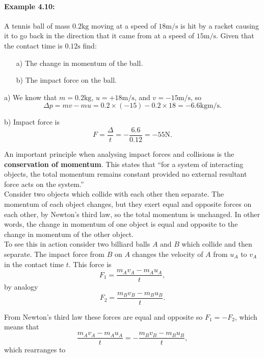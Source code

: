 \documentclass[a4paper,12pt]{book}
\begin{document}
\paragraph{Example 4.10:} A tennis ball of mass $0.2\text{kg}$ moving at a speed of $18\text{m/s}$ is hit by a racket causing it to go back in the direction that it came from at a speed of $15\text{m/s}$. Given that the contact time is $0.12\text{s}$ find:
\begin{itemize}
\setlength{\itemsep}{-5pt}
    \item[a)] The change in momentum of the ball.
    \item[b)] The impact force on the ball.
\end{itemize} 
a) We know that $m=0.2\text{kg}$, $u=+18\text{m/s}$, and $v=-15\text{m/s}$, so 
\begin{equation*}
\Delta p=mv-mu=0.2\times(-15)-0.2\times 18=-6.6\text{kgm/s}.
\end{equation*}

b) Impact force is
\begin{equation*}
F=\frac{\Delta}{t}=-\frac{6.6}{0.12}=-55\text{N}.
\end{equation*}

An important principle when analysing impact forces and collisions is the \textbf{conservation of momentum}. This states that ``for a system of interacting objects, the total momentum remains constant provided no external resultant force acts on the system.''\\

Consider two objects which collide with each other then separate. The momentum of each object changes, but they exert equal and opposite forces on each other, by Newton's third law, so the total momentum is unchanged. In other words, the change in momentum of one object is equal and opposite to the change in momentum of the other object. \\

To see this in action consider two billiard balls $A$ and $B$ which collide and then separate. The impact force from $B$ on $A$ changes the velocity of $A$ from $u_{A}$ to $v_{A}$ in the contact time $t$. This force is
\begin{equation*}
F_{1}=\frac{m_{A}v_{A}-m_{A}u_{A}}{t},
\end{equation*}
by analogy
\begin{equation*}
F_{2}=\frac{m_{B}v_{B}-m_{B}u_{B}}{t}.
\end{equation*}

From Newton's third law these forces are equal and opposite so $F_{1}=-F_{2}$, which means that
\begin{equation*}
\frac{m_{A}v_{A}-m_{A}u_{A}}{t}=-\frac{m_{B}v_{B}-m_{B}u_{B}}{t},
\end{equation*}
which rearranges to
\end{document}
